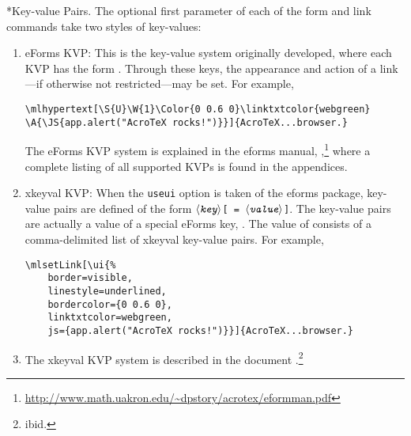 \documentclass{article}
\makeatletter
\def\anglemeta#1{$\langle\textit{\texttt{#1}}\rangle$}
\def\darg#1{\texttt{\{#1\}}}
\let\pkg\textsf
\let\opt\texttt
\let\amtIndent\leftmargini
\renewcommand{\paragraph}
    {\@startsection{paragraph}{4}{0pt}{6pt}{-3pt}{\bfseries}}
\makeatother
\begin{document}
\paragraph*{Key-value Pairs.} The optional first parameter of each of the form and link commands take
two styles of key-values:
\begin{enumerate}
    \item eForms KVP: This is the key-value system originally developed, where each KVP has the form
        \cs{\anglemeta{key}\darg{\anglemeta{val}}}. Through these keys, the appearance
        and action of a link---if otherwise not restricted---may be set.
        For example, 
\begin{Verbatim}[xleftmargin=\amtIndent,fontsize=\small]
\mlhypertext[\S{U}\W{1}\Color{0 0.6 0}\linktxtcolor{webgreen}
\A{\JS{app.alert("AcroTeX rocks!")}}]{AcroTeX...browser.}
\end{Verbatim}

    The eForms KVP system is explained in the eforms manual,
    \textsl{},\footnote
    {\url{http://www.math.uakron.edu/~dpstory/acrotex/eformman.pdf}}
    where a complete listing of all supported KVPs is found in the appendices.

    \item \pkg{xkeyval} KVP: When the \opt{useui} option is taken of the eforms package, key-value pairs are
        defined of the form \texttt{\anglemeta{key}[\,=\,\anglemeta{value}]}. The key-value pairs are actually a value of
        a special eForms key, . The value of  consists of a comma-delimited list of
        \pkg{xkeyval} key-value pairs. For example,
\begin{Verbatim}[xleftmargin=\amtIndent,fontsize=\small]
\mlsetLink[\ui{%
    border=visible,
    linestyle=underlined,
    bordercolor={0 0.6 0},
    linktxtcolor=webgreen,
    js={app.alert("AcroTeX rocks!")}}]{AcroTeX...browser.}
\end{Verbatim}


    \item[] The \pkg{xkeyval} KVP system is described in the document
    \textsl{}.\footnote
    {ibid.}

\end{enumerate}
\end{document}
